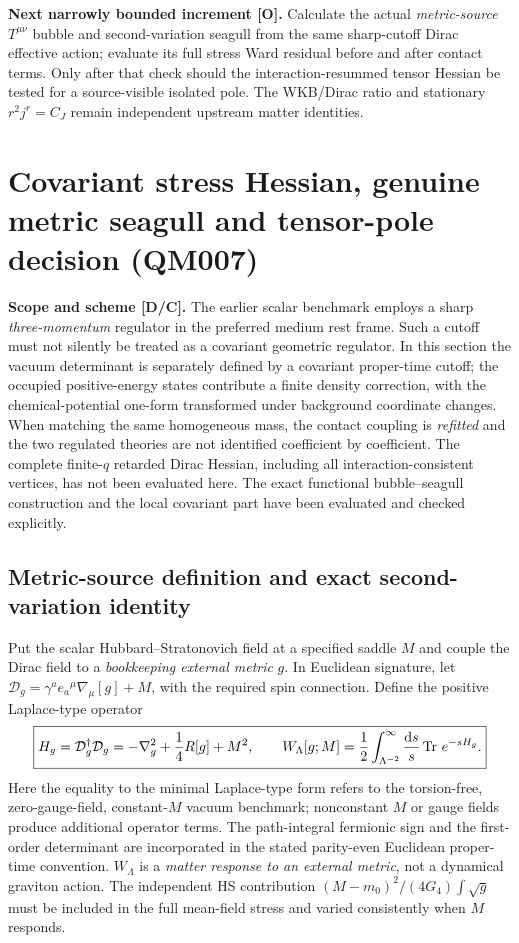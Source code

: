 \documentclass[11pt,a4paper]{article}
\begin{document}
\noindent\textbf{Next narrowly bounded increment [O].} Calculate the actual \emph{metric-source} $T^{\mu\nu}$ bubble and second-variation seagull from the same sharp-cutoff Dirac effective action; evaluate its full stress Ward residual before and after contact terms. Only after that check should the interaction-resummed tensor Hessian be tested for a source-visible isolated pole. The WKB/Dirac ratio and stationary $r^2j^r=C_J$ remain independent upstream matter identities.


\section{Covariant stress Hessian, genuine metric seagull and tensor-pole decision (QM007)}\label{sec:qm007}
\noindent\textbf{Scope and scheme [D/C].} The earlier scalar benchmark employs a sharp \emph{three-momentum} regulator in the preferred medium rest frame. Such a cutoff must not silently be treated as a covariant geometric regulator. In this section the vacuum determinant is separately defined by a covariant proper-time cutoff; the occupied positive-energy states contribute a finite density correction, with the chemical-potential one-form transformed under background coordinate changes. When matching the same homogeneous mass, the contact coupling is \emph{refitted} and the two regulated theories are not identified coefficient by coefficient. The complete finite-$q$ retarded Dirac Hessian, including all interaction-consistent vertices, has not been evaluated here. The exact functional bubble--seagull construction and the local covariant part have been evaluated and checked explicitly.

\subsection{Metric-source definition and exact second-variation identity}
Put the scalar Hubbard--Stratonovich field at a specified saddle $M$ and couple the Dirac field to a \emph{bookkeeping external metric} $g$. In Euclidean signature, let $\mathcal D_g=\gamma^a e_a{}^{\mu}\nabla_\mu[g]+M$, with the required spin connection. Define the positive Laplace-type operator
\begin{equation}\label{eq:qm007-H}
 \boxed{H_g=\mathcal D_g^\dagger\mathcal D_g=-\nabla_g^2+\frac14 R[g]+M^2,\qquad
 W_{\Lambda}[g;M]=\frac12\int_{\Lambda^{-2}}^\infty\frac{\mathrm d s}{s}\operatorname{Tr}\,e^{-sH_g}.}
\end{equation}
Here the equality to the minimal Laplace-type form refers to the torsion-free, zero-gauge-field, constant-$M$ vacuum benchmark; nonconstant $M$ or gauge fields produce additional operator terms. The path-integral fermionic sign and the first-order determinant are incorporated in the stated parity-even Euclidean proper-time convention. $W_\Lambda$ is a \emph{matter response to an external metric}, not a dynamical graviton action. The independent HS contribution $(M-m_0)^2/(4G_4)\int\sqrt g$ must be included in the full mean-field stress and varied consistently when $M$ responds.
\end{document}
